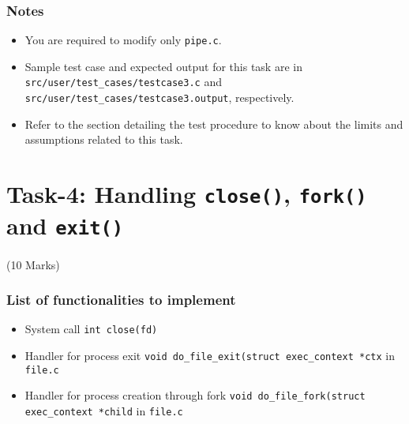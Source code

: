 \documentclass[12pt]{article}
\begin{document}
\subsubsection*{Notes}

\begin{itemize}
    \item You are required to modify only {\tt pipe.c}.
    \item Sample test case and expected output for this task are in {\tt src/user/test\_cases/testcase3.c}
        and {\tt src/user/test\_cases/testcase3.output}, respectively.
    \item Refer to the section detailing the test procedure to know about the limits and assumptions related to
          this task.
\end{itemize}

\section{Task-4: Handling {\tt close()}, {\tt fork()} and {\tt exit()}} (10 Marks)

\subsubsection*{List of functionalities to implement}
\begin{itemize}
    \item System call {\tt int close(fd)}
    \item Handler for process exit {\tt void do\_file\_exit(struct exec\_context *ctx} in {\tt file.c}    
    \item Handler for process creation through fork {\tt void do\_file\_fork(struct exec\_context *child} in {\tt file.c}    
\end{itemize}
\end{document}
